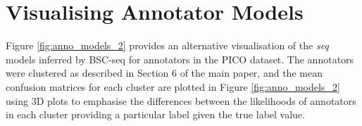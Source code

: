 \documentclass[11pt,a4paper]{article}
\begin{document}
\section{Visualising Annotator Models}

Figure \ref{fig:anno_models_2} provides an alternative visualisation of the \textit{seq} models inferred by BSC-seq for annotators in the PICO dataset.
The annotators were clustered as described in Section 6 of the main paper,
and the mean confusion matrices for each cluster are plotted in Figure \ref{fig:anno_models_2} using 3D plots to emphasise the differences between 
the likelihoods of annotators in each cluster providing a particular label 
given the true label value.
\end{document}
